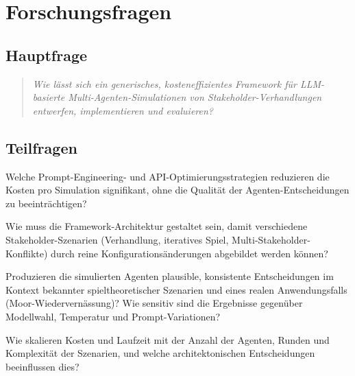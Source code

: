 \documentclass[12pt, a4paper]{article}
\begin{document}
\section{Forschungsfragen}

\subsection*{Hauptfrage}

\begin{quote}
    \textit{Wie lässt sich ein generisches, kosteneffizientes Framework für LLM-basierte Multi-Agenten-Simulationen von Stakeholder-Verhandlungen entwerfen, implementieren und evaluieren?}
\end{quote}

\subsection*{Teilfragen}

\begin{description}[style=nextline, leftmargin=1.5cm]
    \item[F1 (Effizienz)] Welche Prompt-Engineering- und API-Optimierungsstrategien reduzieren die Kosten pro Simulation signifikant, ohne die Qualität der Agenten-Entscheidungen zu beeinträchtigen?

    \item[F2 (Architektur)] Wie muss die Framework-Architektur gestaltet sein, damit verschiedene Stakeholder-Szenarien (Verhandlung, iteratives Spiel, Multi-Stakeholder-Konflikte) durch reine Konfigurationsänderungen abgebildet werden können?

    \item[F3 (Validität)] Produzieren die simulierten Agenten plausible, konsistente Entscheidungen im Kontext bekannter spieltheoretischer Szenarien und eines realen Anwendungsfalls (Moor-Wiedervernässung)? Wie sensitiv sind die Ergebnisse gegenüber Modellwahl, Temperatur und Prompt-Variationen?

    \item[F4 (Skalierung)] Wie skalieren Kosten und Laufzeit mit der Anzahl der Agenten, Runden und Komplexität der Szenarien, und welche architektonischen Entscheidungen beeinflussen dies?
\end{description}

\end{document}
